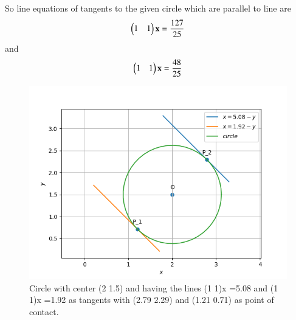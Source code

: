 So line equations of tangents to the given circle which are parallel to line are
\begin{align}
\begin{pmatrix}1 &1\end{pmatrix}\mathbf{x}=\frac{127}{25}
\end{align}and
\newline
\begin{align}
\begin{pmatrix}1 &1\end{pmatrix}\mathbf{x}=\frac{48}{25}
\end{align}
%
\begin{figure}[]
\centering
\includegraphics[width=\columnwidth]{./solutions/4/2/8/Figure_1.png}
\caption{Circle with center (2 1.5) and having the lines (1 1)x =5.08 and (1 1)x =1.92 as tangents with (2.79 2.29) and (1.21 0.71) as point of contact.}
\label{eq:solutions/4/2/8/Fig:Circle}
\end{figure}

